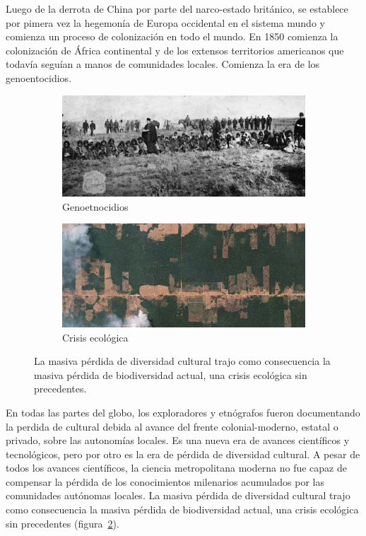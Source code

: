 \documentclass[a4paper,10pt]{book}
\theoremstyle{definition}
\begin{document}
Luego de la derrota de China por parte del narco-estado británico, se establece por pimera vez la hegemonía de Europa occidental en el sistema mundo y comienza un proceso de colonización en todo el mundo.%
En 1850 comienza la colonización de África continental y de los extensos territorios americanos que todavía seguían a manos de comunidades locales.
Comienza la era de los genoentocidios.
\begin{figure}[ht!]
    \centering
    \begin{subfigure}[b]{0.48\textwidth}
    \includegraphics[width=\linewidth]{static/genocidio_patagonia}
    \caption{Genoetnocidios}
    \label{fig:genocidio_patagonia}
    \end{subfigure}
    \begin{subfigure}[b]{0.47\textwidth}
    \includegraphics[width=\linewidth]{static/deforestation-brazil}
    \caption{Crisis ecológica}
    \label{fig:deforestation-brazil}
    \end{subfigure}
    \caption{
    La masiva pérdida de diversidad cultural trajo como consecuencia la masiva pérdida de biodiversidad actual, una crisis ecológica sin precedentes.
    }
    \label{fig:cultural-lose}
\end{figure}
En todas las partes del globo, los exploradores y etnógrafos fueron documentando la perdida de cultural debida al avance del frente colonial-moderno, estatal o privado, sobre las autonomías locales.
Es una nueva era de avances científicos y tecnológicos, pero por otro es la era de pérdida de diversidad cultural.
A pesar de todos los avances científicos, la ciencia metropolitana moderna no fue capaz de compensar la pérdida de los conocimientos milenarios acumulados por las comunidades autónomas locales.
La masiva pérdida de diversidad cultural trajo como consecuencia la masiva pérdida de biodiversidad actual, una crisis ecológica sin precedentes (figura~\ref{fig:deforestation-brazil}).
\end{document}
